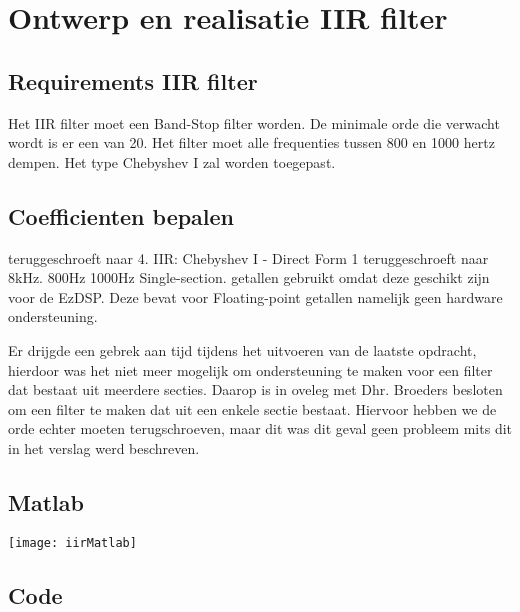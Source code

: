 \section{Ontwerp en realisatie IIR filter}

\subsection{Requirements IIR filter}
Het IIR filter moet een Band-Stop filter worden. De minimale orde die verwacht wordt is er een van 20. Het filter moet alle frequenties tussen 800 en 1000 hertz dempen. Het type Chebyshev I zal worden toegepast.
\subsection{Coefficienten bepalen}

\begin{enumerate}[label=\emph{\alph*)}]
     teruggeschroeft naar 4.
     IIR: Chebyshev I - Direct Form 1 
     teruggeschroeft naar 8kHz.
     800Hz
     1000Hz
     Single-section.
     getallen gebruikt omdat deze geschikt zijn voor de EzDSP. Deze bevat voor Floating-point getallen namelijk geen hardware ondersteuning.
\end{enumerate}

Er drijgde een gebrek aan tijd tijdens het uitvoeren van de laatste opdracht, hierdoor was het niet meer mogelijk om ondersteuning te maken voor een filter dat bestaat uit meerdere secties. 
Daarop is in oveleg met Dhr. Broeders besloten om een filter te maken dat uit een enkele sectie bestaat. Hiervoor hebben we de orde echter moeten terugschroeven, maar dit was dit geval geen probleem mits dit in het verslag werd beschreven. 

\subsection{Matlab}

\texttt{[image: iirMatlab]}\par\vspace{1cm}		
\clearpage
\subsection{Code}

